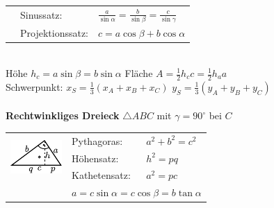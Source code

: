 \documentclass[fs, footer]{latex4ei}
\begin{document}
\begin{multicols*}{4}
{\begin{tabular*}{\columnwidth}{@{\extracolsep\fill}lll@{}}
	& Sinussatz: & $\frac{a}{\sin \alpha} = \frac{b}{\sin \beta} = \frac{c}{\sin \gamma}$ \\[0.2em]
	& Projektionssatz: & $c = a \cos \beta + b \cos \alpha$ \\
\end{tabular*}\\
	Höhe $h_c = a \sin \beta = b \sin \alpha$  \qquad Fläche $A = \frac{1}{2} h_c c = \frac{1}{2} h_a a$\\
	Schwerpunkt: $x_S = \frac{1}{3}(x_A + x_B + x_C)$ \quad $y_S = \frac{1}{3}(y_A + y_B + y_C)$\\ 
\\[1em]
\textbf{Rechtwinkliges Dreieck} $\triangle ABC$ mit $\gamma = 90^\circ$ bei $C$\\[0.2em]
	\begin{tabular}{@{}lll}
	\multirow{3}{2cm}{ \includegraphics[scale = 1.4]{./img/math/rechtwinklig.pdf} } & Pythagoras: & \hspace{-2.5mm} \large $a^2 + b^2 = c^2$\\[0.1em]
	& Höhensatz: & \hspace{-2.5mm} {\large $h^2 = pq$}\\[0.1em]
	& Kathetensatz: & \hspace{-2.5mm} \large $a^2 = pc$\\[0.1em]
	& \multicolumn{2}{l}{\large $a = c \sin \alpha = c \cos \beta = b \tan \alpha$}\\ 
\end{tabular}\\
\\[1em]
 \qquad
{}}
\end{multicols*}
\end{document}
